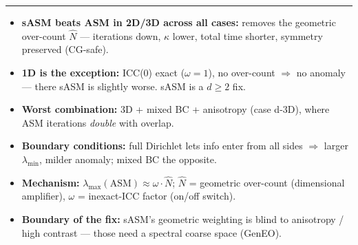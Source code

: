 \documentclass[aspectratio=169,10pt]{beamer}
\begin{document}
{
\begin{frame}[plain]
  \vspace{0.3em}
  {\color{teal}\rule{\linewidth}{1.5pt}}\vspace{0.6em}
  {\color{white}\footnotesize
  \begin{itemize}\setlength\itemsep{0.55em}
   \item[\textcolor{amber}{\textbf{1}}] \textbf{\textcolor{amber}{sASM beats ASM in 2D/3D across all cases:}} removes the geometric over-count $\hat N$ --- iterations down, $\kappa$ lower, total time shorter, symmetry preserved (CG-safe).
   \item[\textcolor{amber}{\textbf{2}}] \textbf{\textcolor{amber}{1D is the exception:}} ICC(0) exact ($\omega{=}1$), no over-count $\Rightarrow$ no anomaly --- there sASM is slightly worse. sASM is a $d\ge2$ fix.
   \item[\textcolor{amber}{\textbf{3}}] \textbf{\textcolor{amber}{Worst combination:}} 3D + mixed BC + anisotropy (case d-3D), where ASM iterations \emph{double} with overlap.
   \item[\textcolor{amber}{\textbf{4}}] \textbf{\textcolor{amber}{Boundary conditions:}} full Dirichlet lets info enter from all sides $\Rightarrow$ larger $\lambda_{\min}$, milder anomaly; mixed BC the opposite.
   \item[\textcolor{amber}{\textbf{5}}] \textbf{\textcolor{amber}{Mechanism:}} $\lambda_{\max}(\text{ASM})\approx\omega\cdot\hat N$; $\hat N$ = geometric over-count (dimensional amplifier), $\omega$ = inexact-ICC factor (on/off switch).
   \item[\textcolor{amber}{\textbf{6}}] \textbf{\textcolor{amber}{Boundary of the fix:}} sASM's geometric weighting is blind to anisotropy / high contrast --- those need a spectral coarse space (GenEO).
  \end{itemize}}
\end{frame}}
\end{document}
